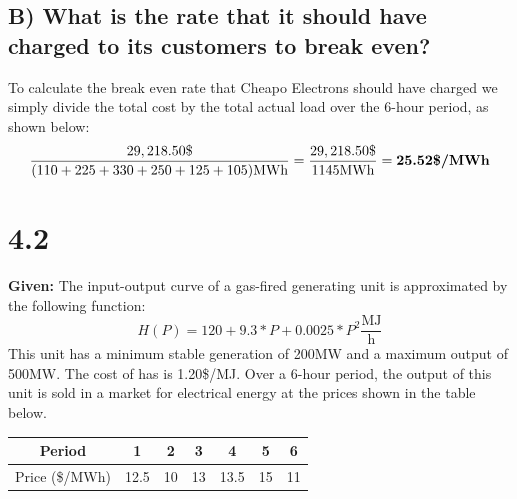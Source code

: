 \documentclass{article}
\begin{document}
\subsection{B) What is the rate that it should have charged to its customers to break even?}
To calculate the break even rate that Cheapo Electrons should have charged we simply divide the total cost by the total actual load over the 6-hour period, as shown below:
$$ \frac{29,218.50\$}{(110+225+330+250+125+105)\text{MWh}} = \frac{29,218.50\$}{1145\text{MWh}} = \textbf{25.52\$/\text{MWh}} $$

\pagebreak
\section{4.2}
\textbf{Given:} The input-output curve of a gas-fired generating unit is approximated by the following function: $$ H(P) = 120+9.3*P+0.0025*P^2\frac{\text{MJ}}{\text{h}} $$ This unit has a minimum stable generation of 200MW and a maximum output of 500MW. The cost of has is 1.20\$/MJ. Over a 6-hour period, the output of this unit is sold in a market for electrical energy at the prices shown in the table below.
\begin{center}
	\begin{tabular}{||c||c|c|c|c|c|c||}
		\hline
		Period         & 1    & 2  & 3  & 4    & 5  &  6 \\
		\hline
		Price (\$/MWh) & 12.5 & 10 & 13 & 13.5 & 15 & 11 \\
		\hline
	\end{tabular}
\end{center}
\end{document}
